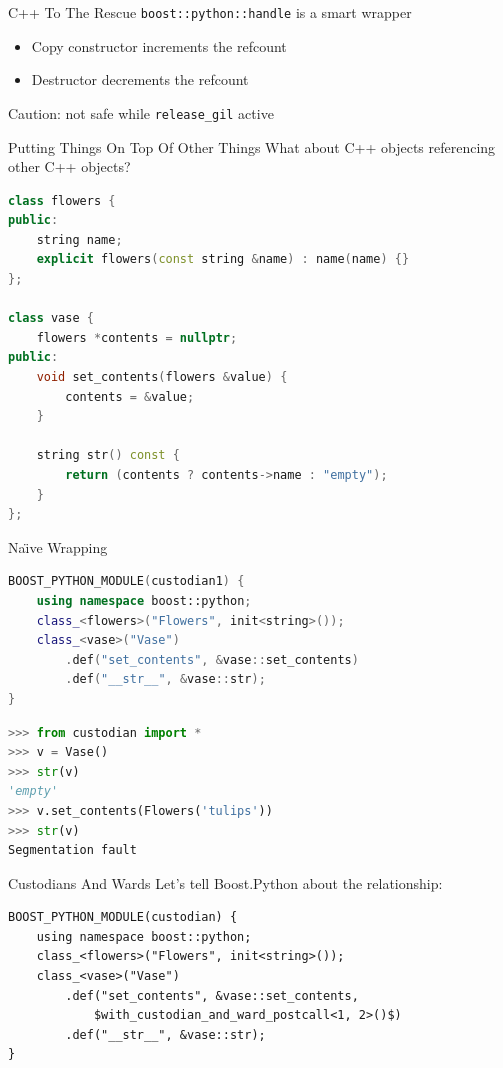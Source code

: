 \documentclass{beamer}
\def\linlinec{\lstinline[basicstyle=\ttfamily,language=c++]}
\begin{document}
\begin{frame}{C++ To The Rescue}
  \linlinec"boost::python::handle" is a smart wrapper
  \begin{itemize}
    \item Copy constructor increments the refcount
    \item Destructor decrements the refcount
  \end{itemize}

  \pause
  \alert{Caution}: not safe while \linlinec{release_gil} active
\end{frame}

\begin{frame}[fragile=singleslide]{Putting Things On Top Of Other Things}
  What about C++ objects referencing other C++ objects?
  \begin{lstlisting}[language=c++]
class flowers {
public:
    string name;
    explicit flowers(const string &name) : name(name) {}
};

class vase {
    flowers *contents = nullptr;
public:
    void set_contents(flowers &value) {
        contents = &value;
    }

    string str() const {
        return (contents ? contents->name : "empty");
    }
};
  \end{lstlisting}
\end{frame}

\begin{frame}[fragile]{Na{\"\i}ve Wrapping}
  \begin{lstlisting}[language=c++]
BOOST_PYTHON_MODULE(custodian1) {
    using namespace boost::python;
    class_<flowers>("Flowers", init<string>());
    class_<vase>("Vase")
        .def("set_contents", &vase::set_contents)
        .def("__str__", &vase::str);
}
  \end{lstlisting}
  \pause
  \begin{lstlisting}[language=python,numbers=none]
>>> from custodian import *
>>> v = Vase()
>>> str(v)
'empty'
>>> v.set_contents(Flowers('tulips'))
>>> str(v)
Segmentation fault
  \end{lstlisting}
\end{frame}

\begin{frame}[fragile=singleslide]{Custodians And Wards}
  Let's tell Boost.Python about the relationship:
  \begin{lstlisting}[language={[extra]c++}]
BOOST_PYTHON_MODULE(custodian) {
    using namespace boost::python;
    class_<flowers>("Flowers", init<string>());
    class_<vase>("Vase")
        .def("set_contents", &vase::set_contents,
            $with_custodian_and_ward_postcall<1, 2>()$)
        .def("__str__", &vase::str);
}
  \end{lstlisting}
\end{frame}
\end{document}
